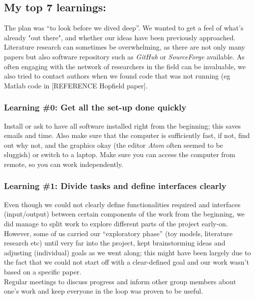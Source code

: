 \documentclass[journal, a4paper]{IEEEtran}
\begin{document}
\subsection{My top 7 learnings:}

The plan was “to look before we dived deep”. We wanted to get a feel of what's already "out there", and whether our ideas have been previously approached. Literature research can sometimes be overwhelming, as there are not only many papers but also software repository such as \textit{GitHub} or \textit{SourceForge} available. As often engaging with the network of researchers in the field can be invaluable, we also tried to contact authors when we found code that was not running (eg Matlab code in [REFERENCE Hopfield paper].


\hfill
\subsubsection{Learning \#0: Get all the set-up done quickly}
Install or ask to have all software installed right from the beginning; this saves emails and time. Also make sure that the computer is sufficiently fast, if not, find out why not, and the graphics okay (the editor \textit{Atom} often seemed to be sluggish) or switch to a laptop. Make sure you can access the computer from remote, so you can work independently.

\hfill
\subsubsection{Learning \#1: Divide tasks and define interfaces clearly}
Even though we could not clearly define functionalities required and interfaces (input/output) between certain components of the work from the beginning, we did manage to split work to explore different parts of the project early-on. However, some of us carried our “exploratory phase” (toy models, literature research etc) until very far into the project, kept brainstorming ideas and adjusting (individual) goals as we went along; this might have been largely due to the fact that we could not start off with a clear-defined goal and our work wasn’t based on a specific paper. \\
Regular meetings to discuss progress and inform other group members about one’s work and keep everyone in the loop was proven to be useful. 

\hfill
\end{document}
